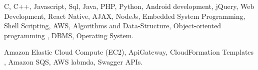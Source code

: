 



\begin{cventries}

\cvproject
{
    \begin{cvitems} %
        \item { C, C++, Javascript, Sql, Java, PHP, Python, Android development, jQuery, Web Development, React Native, AJAX, NodeJs, Embedded System Programming, Shell Scripting, AWS, Algorithms and Data-Structure, Object-oriented programming , DBMS, Operating System.}
        \item { Amazon Elastic Cloud Compute (EC2), ApiGateway, CloudFormation Templates , Amazon SQS, AWS labmda, Swagger APIs. }
        \end{cvitems}
}

\end{cventries}
